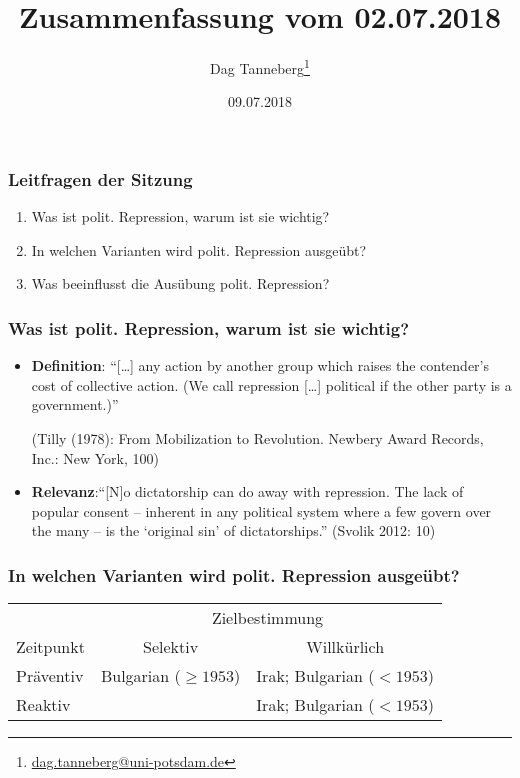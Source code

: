 \documentclass{beamer}
\title{Zusammenfassung vom 02.07.2018}
\author{Dag Tanneberg\thanks{%
  \href{mailto:dag.tanneberg@uni-potsdam.de}%
    {dag.tanneberg@uni-potsdam.de}
  }
}
\institute[Universität Potsdam]{
  {\glqq}Wie erkl\"art man autorit\"are Herrschaft?{\grqq}\\
  Universität Potsdam\\
  Lehrstuhl für Vergleichende Politikwissenschaft\\
  Sommersemester 2018
}
\date{09.07.2018}
\begin{document}
\maketitle

\begin{frame}
  \frametitle{Leitfragen der Sitzung}
  \begin{enumerate}
    \item Was ist polit. Repression, warum ist sie wichtig?
    \item In welchen Varianten wird polit. Repression ausgeübt?
    \item Was beeinflusst die Ausübung polit. Repression?
  \end{enumerate}
\end{frame}

\begin{frame}
  \frametitle{Was ist polit. Repression, warum ist sie wichtig?}
  \begin{itemize}
    \item \textbf{Definition}: ``[\dots] any action by another group which raises the contender's cost of collective action. (We call repression [\dots] political if the other party is a government.)''\newline
    \begin{footnotesize}(Tilly (1978): From Mobilization to Revolution. Newbery Award Records, Inc.: New York,  100)\end{footnotesize}
  \item \textbf{Relevanz}:``[N]o dictatorship can do away with repression. The
    lack of popular consent -- inherent in any political
    system where a few govern over the many -- is the
    `original sin' of dictatorships.'' (Svolik 2012: 10)
  \end{itemize}
\end{frame}

\begin{frame}
  \frametitle{In welchen Varianten wird polit. Repression ausgeübt?}
  \begin{table}
    \centering
    \begin{tabular}{l*{2}{c}}
      \toprule
      ~ & \multicolumn{2}{c}{Zielbestimmung} \\
      Zeitpunkt & Selektiv & Willkürlich \\
      \cmidrule{2-3}
      Präventiv & Bulgarian ($\ge 1953$) & Irak; Bulgarian ($< 1953$)\\
      Reaktiv & & Irak; Bulgarian ($< 1953$)\\
      \bottomrule
    \end{tabular}
  \end{table}
\end{frame}
\end{document}
